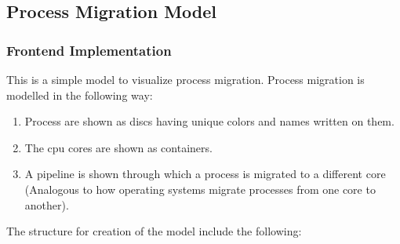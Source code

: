\documentclass[12pt]{article}
\begin{document}
\subsection{Process Migration Model}
\subsubsection{Frontend Implementation}

This is a simple model to visualize process migration. Process migration is modelled in the following way:
\begin{enumerate}
    \item Process are shown as discs having unique colors and names written on them.
    \item The cpu cores are shown as containers.
    \item A pipeline is shown through which a process is migrated to a different core (Analogous to how operating systems migrate processes from one core to another).
\end{enumerate}
The structure for creation of the model include the following:
\end{document}
